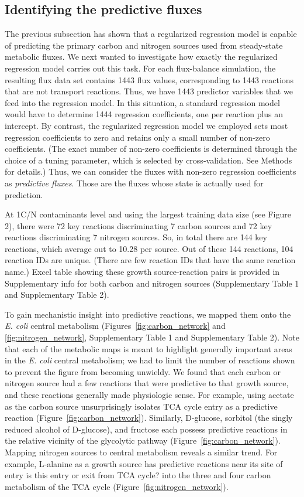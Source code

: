 \documentclass[12pt]{article}
\begin{document}
\subsection*{Identifying the predictive fluxes}

The previous subsection has shown that a regularized regression model is capable of predicting the primary carbon and nitrogen sources used from steady-state metabolic fluxes. We next wanted to investigate how exactly the regularized regression model carries out this task. For each flux-balance simulation, the resulting flux data set contains 1443 flux values, corresponding to 1443 reactions that are not transport reactions. Thus, we have 1443 predictor variables that we feed into the regression model. In this situation, a standard regression model would have to determine 1444 regression coefficients, one per reaction plus an intercept. By contrast, the regularized regression model we employed sets most regression coefficients to zero and retains only a small number of non-zero coefficients. (The exact number of non-zero coefficients is determined through the choice of a tuning parameter, which is selected by cross-validation. See Methods for details.) Thus, we can consider the fluxes with non-zero regression coefficients as \emph{predictive fluxes}. Those are the fluxes whose state is actually used for prediction.

At 1C/N contaminants level and using the largest training data size (see Figure 2), there were 72 key reactions discriminating 7 carbon sources and 72 key reactions discriminating 7 nitrogen sources. So, in total there are 144 key reactions, which average out to 10.28 per source. Out of these 144 reactions, 104 reaction IDs are unique. (There are few reaction IDs that have the same reaction name.) Excel table showing these growth source-reaction pairs is provided in Supplementary info for both carbon and nitrogen sources (Supplementary Table 1 and Supplementary Table 2). 

To gain mechanistic insight into predictive reactions, we mapped them onto the \emph{E. coli} central metabolism (Figures~\ref{fig:carbon_network} and \ref{fig:nitrogen_network}, Supplementary Table 1 and Supplementary Table 2). Note that each of the metabolic maps is meant to highlight generally important areas in the \emph{E. coli} central metabolism; we had to limit the number of reactions shown to prevent the figure from becoming unwieldy. We found that each carbon or nitrogen source had a few reactions that were predictive to that growth source, and these reactions generally made physiologic sense. For example, using acetate as the carbon source unsurprisingly isolates TCA cycle entry as a predictive reaction (Figure~\ref{fig:carbon_network}). Similarly, D-glucose, sorbitol (the singly reduced alcohol of D-glucose), and fructose each possess predictive reactions in the relative vicinity of the glycolytic pathway (Figure~\ref{fig:carbon_network}). Mapping nitrogen sources to central metabolism reveals a similar trend. For example, L-alanine as a growth source has predictive reactions near its site of entry {\color{red}is this entry or exit from TCA cycle?} into the three and four carbon metabolism of the TCA cycle (Figure~\ref{fig:nitrogen_network}).
\end{document}
